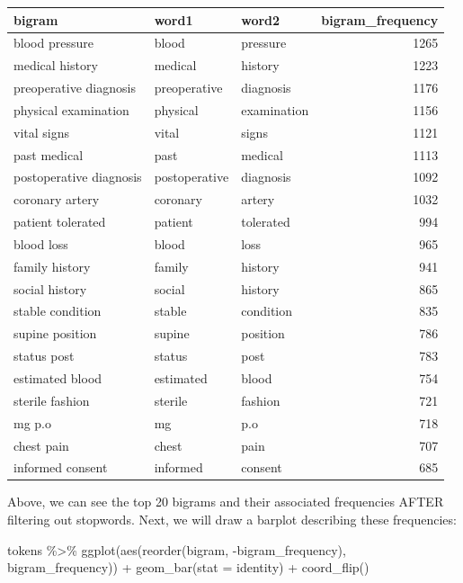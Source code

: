 \documentclass[
]{article}
\newenvironment{Shaded}{\begin{snugshade}}{\end{snugshade}}
\newcommand{\AttributeTok}[1]{\textcolor[rgb]{0.77,0.63,0.00}{#1}}
\newcommand{\FunctionTok}[1]{\textcolor[rgb]{0.00,0.00,0.00}{#1}}
\newcommand{\NormalTok}[1]{#1}
\newcommand{\SpecialCharTok}[1]{\textcolor[rgb]{0.00,0.00,0.00}{#1}}
\newcommand{\StringTok}[1]{\textcolor[rgb]{0.31,0.60,0.02}{#1}}
\begin{document}
\begin{table}
\centering
\begin{tabular}{l|l|l|r}
\hline
bigram & word1 & word2 & bigram\_frequency\\
\hline
blood pressure & blood & pressure & 1265\\
\hline
medical history & medical & history & 1223\\
\hline
preoperative diagnosis & preoperative & diagnosis & 1176\\
\hline
physical examination & physical & examination & 1156\\
\hline
vital signs & vital & signs & 1121\\
\hline
past medical & past & medical & 1113\\
\hline
postoperative diagnosis & postoperative & diagnosis & 1092\\
\hline
coronary artery & coronary & artery & 1032\\
\hline
patient tolerated & patient & tolerated & 994\\
\hline
blood loss & blood & loss & 965\\
\hline
family history & family & history & 941\\
\hline
social history & social & history & 865\\
\hline
stable condition & stable & condition & 835\\
\hline
supine position & supine & position & 786\\
\hline
status post & status & post & 783\\
\hline
estimated blood & estimated & blood & 754\\
\hline
sterile fashion & sterile & fashion & 721\\
\hline
mg p.o & mg & p.o & 718\\
\hline
chest pain & chest & pain & 707\\
\hline
informed consent & informed & consent & 685\\
\hline
\end{tabular}
\end{table}

Above, we can see the top 20 bigrams and their associated frequencies
AFTER filtering out stopwords. Next, we will draw a barplot describing
these frequencies:

\begin{Shaded}
\begin{Highlighting}[]
\NormalTok{tokens }\SpecialCharTok{\%\textgreater{}\%}
  \FunctionTok{ggplot}\NormalTok{(}\FunctionTok{aes}\NormalTok{(}\FunctionTok{reorder}\NormalTok{(bigram, }\SpecialCharTok{{-}}\NormalTok{bigram\_frequency), bigram\_frequency)) }\SpecialCharTok{+}
  \FunctionTok{geom\_bar}\NormalTok{(}\AttributeTok{stat =} \StringTok{\textquotesingle{}identity\textquotesingle{}}\NormalTok{) }\SpecialCharTok{+}
  \FunctionTok{coord\_flip}\NormalTok{()}
\end{Highlighting}
\end{Shaded}
\end{document}
